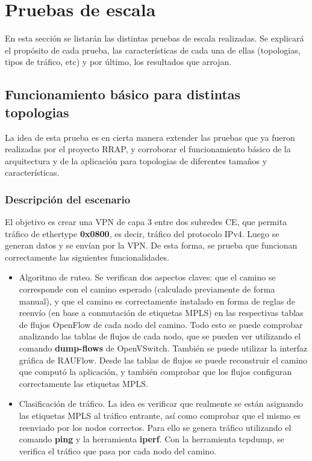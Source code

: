 \chapter{Pruebas de escala}
En esta sección se listarán las distintas pruebas de escala realizadas. Se explicará el propósito de cada prueba, las características de cada una de ellas (topologias, tipos de tráfico, etc) y por último, los resultados que arrojan.

\section{Funcionamiento básico para distintas topologias}
La idea de esta prueba es en cierta manera extender las pruebas que ya fueron realizadas por el proyecto RRAP, y corroborar el funcionamiento básico de la arquitectura y de la aplicación para topologias de diferentes tamaños y características.
\subsection{Descripción del escenario}
El objetivo es crear una VPN de capa 3 entre dos subredes CE, que permita tráfico de ethertype \textbf{0x0800}, es decir, tráfico del protocolo IPv4. Luego se generan datos y se envían por la VPN. De esta forma, se prueba que funcionan correctamente las siguientes funcionalidades.

\begin{itemize}
	\item Algoritmo de ruteo. Se verifican dos aspectos claves: que el camino se corresponde con el camino esperado (calculado previamente de forma manual), y que el camino es correctamente instalado en forma de reglas de reenvío (en base a conmutación de etiquetas MPLS) en las respectivas tablas de flujos OpenFlow de cada nodo del camino. Todo esto se puede comprobar analizando las tablas de flujos de cada nodo, que se pueden ver utilizando el comando \textbf{dump-flows} de OpenVSwitch. También se puede utilizar la interfaz gráfica de RAUFlow. Desde las tablas de flujos se puede reconstruir el camino que computó la aplicación, y también comprobar que los flujos configuran correctamente las etiquetas MPLS.
	
	\item Clasificación de tráfico. La idea es verificar que realmente se están asignando las etiquetas MPLS al tráfico entrante, así como comprobar que el mismo es reenviado por los nodos correctos. Para ello se genera tráfico utilizando el comando \textbf{ping} y la herramienta \textbf{iperf}. Con la herramienta tcpdump, se verifica el tráfico que pasa por cada nodo del camino.
\end{itemize}

